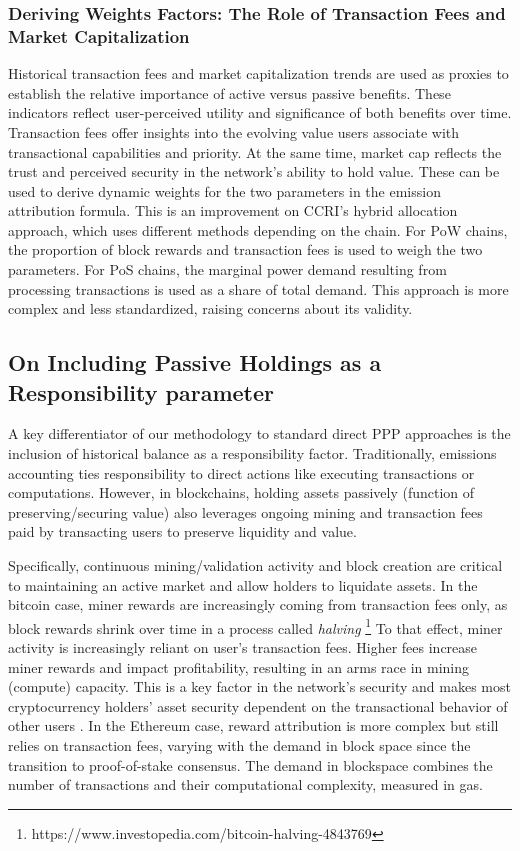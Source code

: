 \documentclass[11pt]{report}
\begin{document}
\subsubsection*{Deriving Weights Factors: The Role of Transaction Fees and Market Capitalization}
Historical transaction fees and market capitalization trends are used as proxies to establish the relative importance of active versus passive benefits. These indicators reflect user-perceived utility and significance of both benefits over time. Transaction fees offer insights into the evolving value users associate with transactional capabilities and priority. At the same time, market cap reflects the trust and perceived security in the network's ability to hold value. These can be used to derive dynamic weights for the two parameters in the emission attribution formula. This is an improvement on CCRI's hybrid allocation approach, which uses different methods depending on the chain. For PoW chains, the proportion of block rewards and transaction fees is used to weigh the two parameters. For PoS chains, the marginal power demand resulting from processing transactions is used as a share of total demand. This approach is more complex and less standardized, raising concerns about its validity.


\subsection{On Including Passive Holdings as a Responsibility parameter \label{sec:passive_holdings}}
A key differentiator of our methodology to standard direct \ac{PPP} approaches is the inclusion of historical balance as a responsibility factor. Traditionally, emissions accounting ties responsibility to direct actions like executing transactions or computations. However, in blockchains, holding assets passively (function of preserving/securing value) also leverages ongoing mining and transaction fees paid by transacting users to preserve liquidity and value.


Specifically, continuous mining/validation activity and block creation are critical to maintaining an active market and allow holders to liquidate assets. In the bitcoin case, miner rewards are increasingly coming from transaction fees only, as block rewards shrink over time in a process called \textit{halving} \footnote{https://www.investopedia.com/bitcoin-halving-4843769} To that effect, miner activity is increasingly reliant on user's transaction fees. Higher fees increase miner rewards and impact profitability, resulting in an arms race in mining (compute) capacity. This is a key factor in the network's security and makes most cryptocurrency holders' asset security dependent on the transactional behavior of other users \cite{easleyMiningMarketsEvolution2019}. In the Ethereum case, reward attribution is more complex but still relies on transaction fees, varying with the demand in block space since the transition to proof-of-stake consensus. The demand in blockspace combines the number of transactions and their computational complexity, measured in gas.
\end{document}
